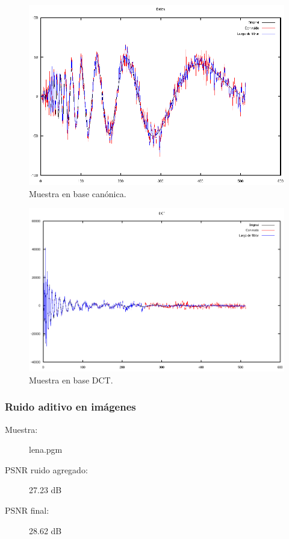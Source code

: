 \documentclass[a4paper,10pt,twoside]{article}
\begin{document}
\begin{figure}[H]
  \centering
  \includegraphics[width=15cm]{graficos/dopp_aditivo_atenuar_muestra.png}
  \caption{Muestra en base canónica.}
\end{figure}

\begin{figure}[H]
  \centering
  \includegraphics[width=15cm]{graficos/dopp_aditivo_atenuar_dct.png} 
  \caption{Muestra en base DCT.}
\end{figure}


\subsubsection{Ruido aditivo en imágenes}

\begin{description}
  \item[Muestra:] lena.pgm
  \item[PSNR ruido agregado:] 27.23 dB
  \item[PSNR final:] 28.62 dB
\end{description}
\end{document}
